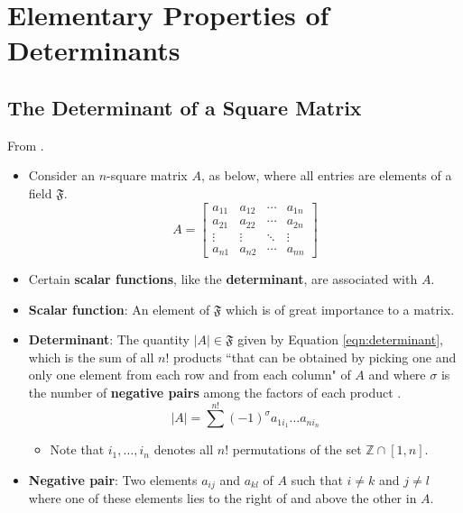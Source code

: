 \documentclass[titlepage]{article}
\numberwithin{figure}{section}
\numberwithin{equation}{section}
\numberwithin{theorem}{section}
\newcommand{\dq}[4][]{``#2"#1 \cite[#4]{#3}.}
\begin{document}
\section{Elementary Properties of Determinants}
\subsection{The Determinant of a Square Matrix}
From \cite{bib:determinants}.
\begin{itemize}
    \item Consider an $n$-square matrix $A$, as below, where all entries are elements of a field $\mathfrak{F}$.
    \begin{equation*}
        A=
        \begin{bmatrix}
            a_{11} & a_{12} & \cdots & a_{1n}\\
            a_{21} & a_{22} & \cdots & a_{2n}\\
            \vdots & \vdots & \ddots & \vdots\\
            a_{n1} & a_{n2} & \cdots & a_{nn}
        \end{bmatrix}
    \end{equation*}
    \item Certain \textbf{scalar functions}, like the \textbf{determinant}, are associated with $A$.
    \item \textbf{Scalar function}: An element of $\mathfrak{F}$ which is of great importance to a matrix.
    \item \textbf{Determinant}: The quantity $|A|\in\mathfrak{F}$ given by Equation \ref{eqn:determinant}, which is the sum of all $n!$ products \dq[ of $A$ and where $\sigma$ is the number of \textbf{negative pairs} among the factors of each product]{that can be obtained by picking one and only one element from each row and from each column}{bib:determinants}{14}
    \begin{equation}\label{eqn:determinant}
        |A| = \sum^{n!}(-1)^\sigma a_{1i_1}\dots a_{ni_n}
    \end{equation}
    \begin{itemize}
        \item Note that $i_1,\dots,i_n$ denotes all $n!$ permutations of the set $\mathbb{Z}\cap[1,n]$.
    \end{itemize}
    \item \textbf{Negative pair}: Two elements $a_{ij}$ and $a_{kl}$ of $A$ such that $i\neq k$ and $j\neq l$ where one of these elements lies to the right of and above the other in $A$.

\end{itemize}
\end{document}
